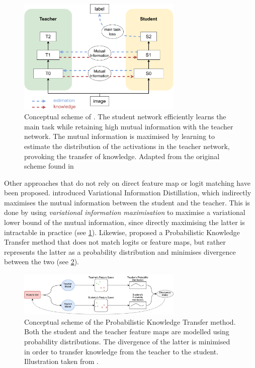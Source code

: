 \begin{figure}[htbp]
    \centering
    \includegraphics[width=0.7\textwidth]{chapter_sota/assets/variational_info_distillation.pdf}
    \caption{Conceptual scheme of \cite{DBLP:conf/cvpr/AhnHDLD19}. The student
    network efficiently learns the main task while retaining high mutual information
    with the teacher network. The mutual information is maximised by learning to
    estimate the distribution of the activations in the teacher network, provoking
    the transfer of knowledge. Adapted from the original
    scheme found in \cite{DBLP:conf/cvpr/AhnHDLD19}}
    \label{fig:sota:vid_scheme}
\end{figure}

Other approaches that do not rely on direct feature map or logit matching have
been proposed. \cite{DBLP:conf/cvpr/AhnHDLD19} introduced Variational
Information Distillation, which indirectly maximises the mutual information
between the student and the teacher. This is done by using \emph{variational
information maximisation} \cite{barber2004algorithm} to maximise a variational
lower bound of the mutual information, since directly maximising the latter is
intractable in practice (see \cref{fig:sota:vid_scheme}). Likewise,
\cite{DBLP:conf/eccv/PassalisT18} proposed a Probabilistic Knowledge Transfer
method that does not match logits or feature maps, but rather represents the
latter as a probability distribution and minimises divergence between the two
(see \cref{fig:sota:pkt_scheme}).\\


\begin{figure}[htbp]
    \centering
    \includegraphics[width=0.7\textwidth]{chapter_sota/assets/pkt_diagram.pdf}
    \caption{Conceptual scheme of the
    Probabilistic Knowledge Transfer method. Both the student and the teacher
    feature maps are modelled using probability distributions. The divergence of the
    latter is minimised in order to transfer knowledge from the teacher to the
    student. Illustration taken from \cite{DBLP:conf/eccv/PassalisT18}.}
    \label{fig:sota:pkt_scheme}
\end{figure}

